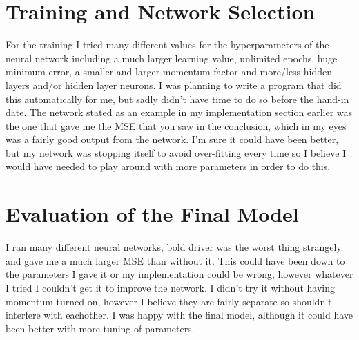 \documentclass[10pt, a4paper]{article}
\begin{document}
\newpage
\section{Training and Network Selection}
For the training I tried many different values for the hyperparameters of the neural network including a much larger learning value, unlimited epochs, huge minimum error, a smaller and larger momentum factor and more/less hidden layers and/or hidden layer neurons. I was planning to write a program that did this automatically for me, but sadly didn't have time to do so before the hand-in date. The network stated as an example in my implementation section earlier was the one that gave me the MSE that you saw in the conclusion, which in my eyes was a fairly good output from the network. I'm sure it could have been better, but my network was stopping itself to avoid over-fitting every time so I believe I would have needed to play around with more parameters in order to do this.

\section{Evaluation of the Final Model}
I ran many different neural networks, bold driver was the worst thing strangely and gave me a much larger MSE than without it. This could have been down to the parameters I gave it or my implementation could be wrong, however whatever I tried I couldn't get it to improve the network. I didn't try it without having momentum turned on, however I believe they are fairly separate so shouldn't interfere with eachother. I was happy with the final model, although it could have been better with more tuning of parameters.

\newpage
\end{document}
